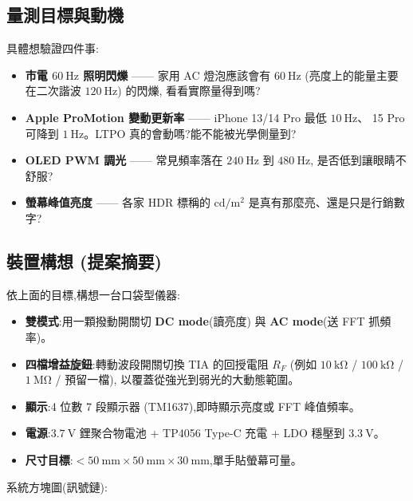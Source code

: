 \subsection*{量測目標與動機}

具體想驗證四件事:

\begin{itemize}[leftmargin=2em,itemsep=0pt]
  \item \textbf{市電 \(\SI{60}{\hertz}\) 照明閃爍} —— 家用 AC 燈泡應該會有 \(\SI{60}{\hertz}\)
        (亮度上的能量主要在二次諧波 \(\SI{120}{\hertz}\)) 的閃爍,
        看看實際量得到嗎?
  \item \textbf{Apple ProMotion 變動更新率} —— iPhone 13/14 Pro 最低 \(\SI{10}{\hertz}\)、
        15 Pro 可降到 \(\SI{1}{\hertz}\)。LTPO 真的會動嗎?能不能被光學側量到?
  \item \textbf{OLED PWM 調光} —— 常見頻率落在 \(\SI{240}{\hertz}\) 到 \(\SI{480}{\hertz}\),
        是否低到讓眼睛不舒服?
  \item \textbf{螢幕峰值亮度} —— 各家 HDR 標稱的 \(\si{\candela\per\square\metre}\)
        是真有那麼亮、還是只是行銷數字?
\end{itemize}

\subsection*{裝置構想 (提案摘要)}

依上面的目標,構想一台口袋型儀器:

\begin{itemize}[leftmargin=2em,itemsep=0pt]
  \item \textbf{雙模式}:用一顆撥動開關切 \textbf{DC mode}(讀亮度) 與
        \textbf{AC mode}(送 FFT 抓頻率)。
  \item \textbf{四檔增益旋鈕}:轉動波段開關切換 TIA 的回授電阻 \(R_F\)
        (例如 \(\SI{10}{\kilo\ohm}\) / \(\SI{100}{\kilo\ohm}\) /
        \(\SI{1}{\mega\ohm}\) / 預留一檔),
        以覆蓋從強光到弱光的大動態範圍。
  \item \textbf{顯示}:4 位數 7 段顯示器 (TM1637),即時顯示亮度或 FFT 峰值頻率。
  \item \textbf{電源}:\(\SI{3.7}{\volt}\) 鋰聚合物電池 + TP4056 Type-C 充電 +
        LDO 穩壓到 \(\SI{3.3}{\volt}\)。
  \item \textbf{尺寸目標}:\(< \SI{50}{\milli\metre}\!\times\!\SI{50}{\milli\metre}
        \!\times\!\SI{30}{\milli\metre}\),單手貼螢幕可量。
\end{itemize}

系統方塊圖(訊號鏈):

